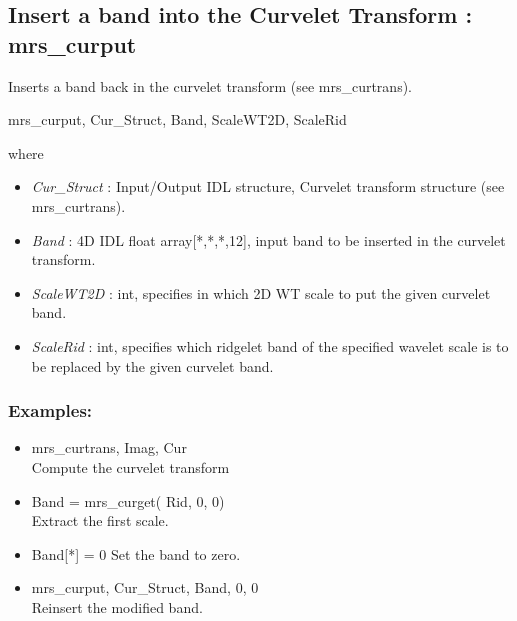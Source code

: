 \subsection{Insert a band into the Curvelet Transform : mrs\_curput}
Inserts a band back in the curvelet transform (see mrs\_curtrans).   
{\bf
\begin{center}
      mrs\_curput, Cur\_Struct, Band, ScaleWT2D, ScaleRid
\end{center}}
where
\begin{itemize}
\item {\em Cur\_Struct} : Input/Output IDL structure, Curvelet transform structure (see mrs\_curtrans).
\item {\em Band} : 4D IDL float array[*,*,*,12], input band to be inserted in the curvelet transform.
\item {\em ScaleWT2D} : int, specifies in which 2D WT scale to put the given curvelet band.
\item {\em ScaleRid} : int, specifies which ridgelet band of the specified wavelet scale is to be replaced by the given curvelet band. 
\end{itemize}

\subsubsection*{Examples:} 
\begin{itemize}
\item mrs\_curtrans, Imag, Cur   \\
Compute the curvelet transform
\item Band = mrs\_curget( Rid, 0, 0) \\
Extract the first scale.
\item Band[*] = 0
Set the band to zero.
\item mrs\_curput, Cur\_Struct, Band, 0, 0 \\
Reinsert the modified band.  
\end{itemize}



